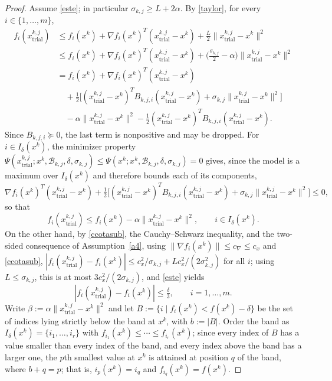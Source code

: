 \documentclass[11pt]{article}
\newcommand{\xkjtrial}{x^{k,j}_{\mathrm{trial}}}
\begin{document}
\begin{proof}
Assume \eqref{este}; in particular $\sigma_{k,j} \geq L + 2\alpha$. By
\eqref{taylor}, for every $i \in \{1, \ldots, m\}$,
\begin{align*}
f_i(\xkjtrial)
&\leq f_i(x^k) + \nabla f_i(x^k)^T(\xkjtrial - x^k)
+ \tfrac{L}{2}\|\xkjtrial - x^k\|^2 \\
&\leq f_i(x^k) + \nabla f_i(x^k)^T(\xkjtrial - x^k)
+ \Big( \tfrac{\sigma_{k,j}}{2} - \alpha \Big) \|\xkjtrial - x^k\|^2 \\
&= f_i(x^k) + \nabla f_i(x^k)^T(\xkjtrial - x^k) \\
&\quad + \tfrac{1}{2} \big[ (\xkjtrial - x^k)^T B_{k,j,i} (\xkjtrial - x^k)
+ \sigma_{k,j}\|\xkjtrial - x^k\|^2 \big] \\
&\quad - \alpha \|\xkjtrial - x^k\|^2
- \tfrac{1}{2}(\xkjtrial - x^k)^T B_{k,j,i} (\xkjtrial - x^k).
\end{align*}
Since $B_{k,j,i} \succeq 0$, the last term is nonpositive and may be dropped. For
$i \in I_\delta(x^k)$, the minimizer property
$\Psi(\xkjtrial; x^k, \mathcal{B}_{k,j}, \delta, \sigma_{k,j}) \leq
\Psi(x^k; x^k, \mathcal{B}_{k,j}, \delta, \sigma_{k,j}) = 0$ gives, since the
model is a maximum over $I_\delta(x^k)$ and therefore bounds each of its
components,
\[
\nabla f_i(x^k)^T(\xkjtrial - x^k)
+ \tfrac{1}{2} \big[ (\xkjtrial - x^k)^T B_{k,j,i} (\xkjtrial - x^k)
+ \sigma_{k,j}\|\xkjtrial - x^k\|^2 \big] \leq 0,
\]
so that
\begin{equation} \label{cota-lem2}
f_i(\xkjtrial) \leq f_i(x^k) - \alpha \|\xkjtrial - x^k\|^2, \qquad
i \in I_\delta(x^k).
\end{equation}
On the other hand, by \eqref{ccotasub}, the Cauchy--Schwarz inequality, and the
two-sided consequence of Assumption~\ref{a4}, using
$\|\nabla f_i(x^k)\| \leq c_\nabla \leq c_x$ and \eqref{ccotasub},
$|f_i(\xkjtrial) - f_i(x^k)| \leq c_x^2/\sigma_{k,j}
+ L c_x^2/(2\sigma_{k,j}^2)$ for all $i$; using $L \leq \sigma_{k,j}$, this is
at most $3c_x^2/(2\sigma_{k,j})$, and \eqref{este} yields
\begin{equation} \label{teo7eq1}
|f_i(\xkjtrial) - f_i(x^k)| \leq \tfrac{\delta}{3}, \qquad i = 1, \ldots, m.
\end{equation}
Write $\beta := \alpha\|\xkjtrial - x^k\|^2$ and let
$B := \{ i \mid f_i(x^k) < f(x^k) - \delta \}$ be the set of indices lying
strictly below the band at $x^k$, with $b := |B|$. Order the band as
$I_\delta(x^k) = \{i_1, \ldots, i_r\}$ with
$f_{i_1}(x^k) \leq \cdots \leq f_{i_r}(x^k)$; since every index of $B$ has a
value smaller than every index of the band, and every index above the band has
a larger one, the $p$th smallest value at $x^k$ is attained at position $q$ of
the band, where $b + q = p$; that is, $i_p(x^k) = i_q$ and
$f_{i_q}(x^k) = f(x^k)$.


\end{proof}
\end{document}
